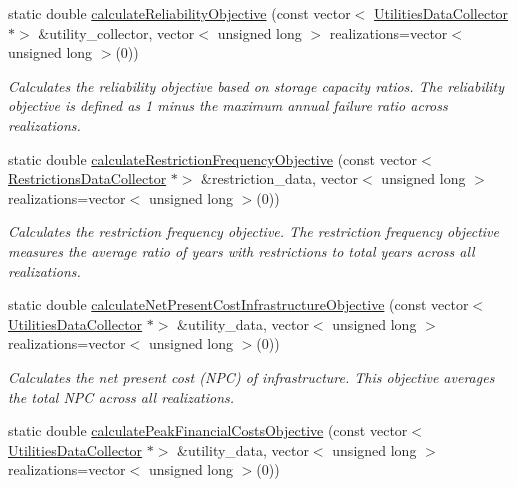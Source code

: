 \begin{DoxyCompactItemize}
\item 
static double \mbox{\hyperlink{classObjectivesCalculator_a4f34e541d573cc2e0690cfcdd8460c16}{calculate\+Reliability\+Objective}} (const vector$<$ \mbox{\hyperlink{classUtilitiesDataCollector}{Utilities\+Data\+Collector}} $\ast$$>$ \&utility\+\_\+collector, vector$<$ unsigned long $>$ realizations=vector$<$ unsigned long $>$(0))
\begin{DoxyCompactList}\small\item\em Calculates the reliability objective based on storage capacity ratios. The reliability objective is defined as 1 minus the maximum annual failure ratio across realizations. \end{DoxyCompactList}\item 
static double \mbox{\hyperlink{classObjectivesCalculator_ab01034697c3e9876fd06bff0c880b5ca}{calculate\+Restriction\+Frequency\+Objective}} (const vector$<$ \mbox{\hyperlink{classRestrictionsDataCollector}{Restrictions\+Data\+Collector}} $\ast$$>$ \&restriction\+\_\+data, vector$<$ unsigned long $>$ realizations=vector$<$ unsigned long $>$(0))
\begin{DoxyCompactList}\small\item\em Calculates the restriction frequency objective. The restriction frequency objective measures the average ratio of years with restrictions to total years across all realizations. \end{DoxyCompactList}\item 
static double \mbox{\hyperlink{classObjectivesCalculator_ac0860168c763c1957be518ba1a019812}{calculate\+Net\+Present\+Cost\+Infrastructure\+Objective}} (const vector$<$ \mbox{\hyperlink{classUtilitiesDataCollector}{Utilities\+Data\+Collector}} $\ast$$>$ \&utility\+\_\+data, vector$<$ unsigned long $>$ realizations=vector$<$ unsigned long $>$(0))
\begin{DoxyCompactList}\small\item\em Calculates the net present cost (N\+PC) of infrastructure. This objective averages the total N\+PC across all realizations. \end{DoxyCompactList}\item 
static double \mbox{\hyperlink{classObjectivesCalculator_a3de288911848c40150918d04879bdacb}{calculate\+Peak\+Financial\+Costs\+Objective}} (const vector$<$ \mbox{\hyperlink{classUtilitiesDataCollector}{Utilities\+Data\+Collector}} $\ast$$>$ \&utility\+\_\+data, vector$<$ unsigned long $>$ realizations=vector$<$ unsigned long $>$(0))

\end{DoxyCompactItemize}
